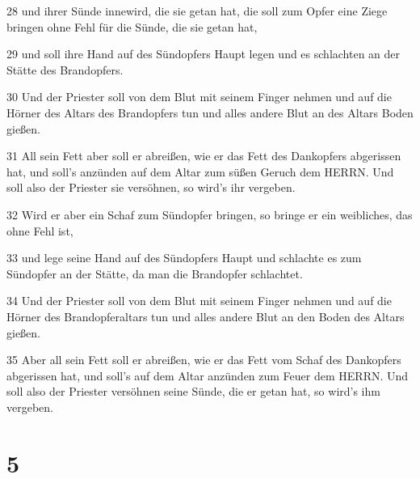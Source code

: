 \par 28 und ihrer Sünde innewird, die sie getan hat, die soll zum Opfer eine Ziege bringen ohne Fehl für die Sünde, die sie getan hat,
\par 29 und soll ihre Hand auf des Sündopfers Haupt legen und es schlachten an der Stätte des Brandopfers.
\par 30 Und der Priester soll von dem Blut mit seinem Finger nehmen und auf die Hörner des Altars des Brandopfers tun und alles andere Blut an des Altars Boden gießen.
\par 31 All sein Fett aber soll er abreißen, wie er das Fett des Dankopfers abgerissen hat, und soll's anzünden auf dem Altar zum süßen Geruch dem HERRN. Und soll also der Priester sie versöhnen, so wird's ihr vergeben.
\par 32 Wird er aber ein Schaf zum Sündopfer bringen, so bringe er ein weibliches, das ohne Fehl ist,
\par 33 und lege seine Hand auf des Sündopfers Haupt und schlachte es zum Sündopfer an der Stätte, da man die Brandopfer schlachtet.
\par 34 Und der Priester soll von dem Blut mit seinem Finger nehmen und auf die Hörner des Brandopferaltars tun und alles andere Blut an den Boden des Altars gießen.
\par 35 Aber all sein Fett soll er abreißen, wie er das Fett vom Schaf des Dankopfers abgerissen hat, und soll's auf dem Altar anzünden zum Feuer dem HERRN. Und soll also der Priester versöhnen seine Sünde, die er getan hat, so wird's ihm vergeben.

\chapter{5}

